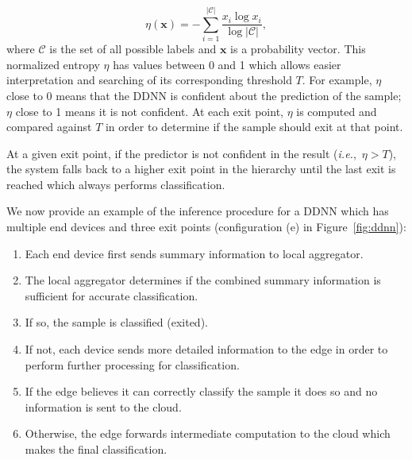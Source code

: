 \documentclass[10pt, conference, compsocconf]{IEEEtran}
\newcommand{\ie}{\emph{i.e.}}
\begin{document}
$$\eta (\mathbf{x}) =-\sum_{i=1}^{|\mathcal{C}|}{\frac {x_{i}\log x_{i}}{\log |\mathcal{C}|}},$$
%
where $\mathcal C$ is the set of all possible labels and $\textbf{x}$ is a probability vector. This normalized entropy $\eta$ has values between 0 and 1 which allows easier interpretation and searching of its corresponding threshold $T$. For example, $\eta$ close to 0 means that the DDNN is confident about the prediction of the sample; $\eta$ close to 1 means it is not confident. At each exit point, $\eta$ is computed and compared against $T$ in order to determine if the sample should exit at that point.

At a given exit point, if the predictor is not confident in the result (\ie,~$\eta > T$), the system falls back to a higher exit point in the hierarchy until the last exit is reached which always performs classification.

We now provide an example of the inference procedure for a DDNN which has multiple end devices and three exit points (configuration (e) in Figure~\ref{fig:ddnn}):
\begin{enumerate}
  \item Each end device first sends summary information to local aggregator.
  \item The local aggregator determines if the combined summary information is sufficient for accurate classification.
  \item If so, the sample is classified (exited). %
  \item If not, each device sends more detailed information to the edge in order to perform further processing for classification.
  \item If the edge believes it can correctly classify the sample it does so and no information is sent to the cloud.
  \item Otherwise, the edge forwards intermediate computation to the cloud which makes the final classification.
\end{enumerate}
\end{document}
